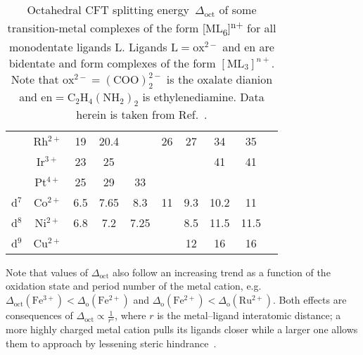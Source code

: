 \begin{table}[ht!]
{\begin{tabular}{ c c c c c c c c c c }
       & Rh$^{2+}$ & 19 & 20.4 &  & 26 & 27 & 34 & 35 &  \\
       & Ir$^{3+}$ & 23 & 25 &  &  &  & 41 & 41 &  \\
       & Pt$^{4+}$ & 25 & 29 & 33 &  &  &  &  &  \\
      d$^7$ & Co$^{2+}$ & 6.5 & 7.65 & 8.3 & 11 & 9.3 & 10.2 & 11 &  \\
      d$^8$ & Ni$^{2+}$ & 6.8 & 7.2 & 7.25 &  & 8.5 & 11.5 & 11.5 &  \\
      d$^9$ & Cu$^{2+}$ &  &  &  &  & 12 & 16 & 16 & \\
      \bottomrule
    \end{tabular}
  }
  \caption{Octahedral CFT splitting energy~$\Delta_\text{oct}$
    of some transition-metal complexes of the form [ML\textsubscript{6}]\textsuperscript{n+}
    for all monodentate ligands L. Ligands $\mathrm{L = ox^{2-}}$ and en are bidentate
    and form complexes of the form $\mathrm{[ML_3]}^{n+}$.
    Note that $\mathrm{ox^{2-} = (COO)_2^{2-}}$ is the oxalate dianion
    and $\mathrm{en = C_2 H_4 (NH_2)_2}$ is ethylenediamine.
    Data herein is taken from Ref.~\cite{FiggisBook}.
  }
  \label{tab: cft-full}
\end{table}

Note that values of $\Delta_\text{oct}$ also follow an increasing trend as a function
of the oxidation state and period number of the metal cation,
e.g. $\Delta_\text{oct}(\mathrm{Fe^{3+}}) < \Delta_\mathrm{o}(\mathrm{Fe^{2+}})$
and $\Delta_\mathrm{o}(\mathrm{Fe^{2+}}) < \Delta_\mathrm{o}(\mathrm{Ru^{2+}})$.
Both effects are consequences of $\Delta_\text{oct} \propto \frac{1}{r^5}$,
where $r$ is the metal--ligand interatomic distance;
a more highly charged metal cation pulls its ligands closer while
a larger one allows them to approach by lessening steric hindrance~\cite{FiggisBook}.
